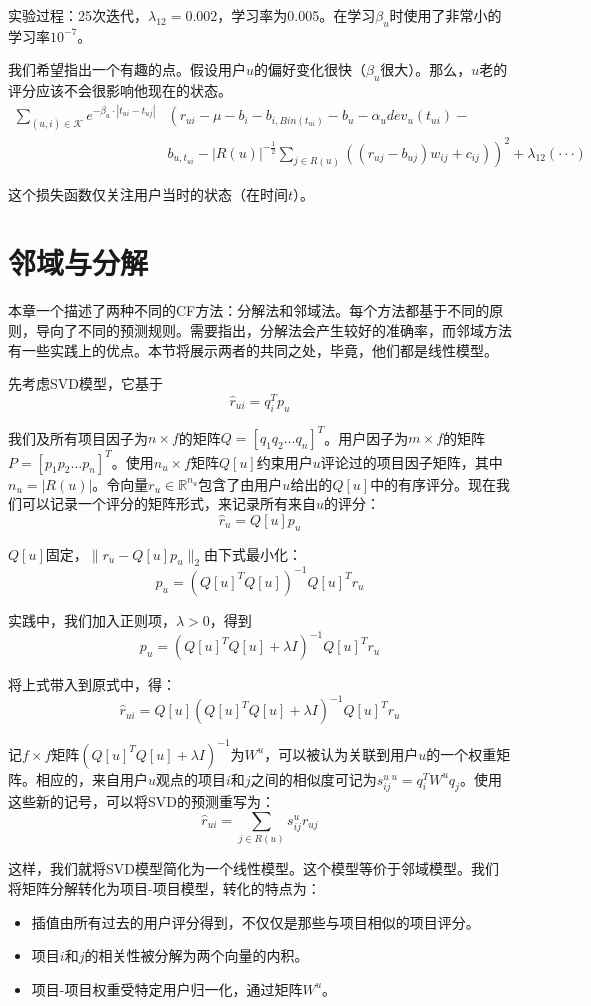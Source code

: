 \documentclass{article}
\begin{document}
实验过程：25次迭代，$\lambda_{12}=0.002$，学习率为0.005。在学习$\beta_u$时使用了非常小的学习率$10^{-7}$。

我们希望指出一个有趣的点。假设用户$u$的偏好变化很快（$\beta_u$很大）。那么，$u$老的评分应该不会很影响他现在的状态。
\[
\begin{array}{cl}
\mathop{\sum}\limits_{(u,i)\in\mathcal{K}}e^{-\beta_u\cdot|t_{ui}-t_{uj}|} & \left(r_{ui}-\mu-b_i-b_{i,Bin(t_{ui})}-b_u-\alpha_u dev_u(t_{ui})-\right.\\
  & \left.b_{u,t_{ui}}-|R(u)|^{-\frac{1}{2}}\mathop{\sum}\limits_{j\in R(u)}((r_{uj}-b_{uj})w_{ij}+c_{ij})\right)^2+\lambda_{12}(\cdot\cdot\cdot)
\end{array}
\]

这个损失函数仅关注用户当时的状态（在时间$t$）。

\section{邻域与分解}
本章一个描述了两种不同的CF方法：分解法和邻域法。每个方法都基于不同的原则，导向了不同的预测规则。需要指出，分解法会产生较好的准确率，而邻域方法有一些实践上的优点。本节将展示两者的共同之处，毕竟，他们都是线性模型。

先考虑SVD模型，它基于
$$ \hat{r}_{ui}=q_i^Tp_u $$

我们及所有项目因子为$n\times f$的矩阵$Q=[q_1q_2\dots q_n]^T$。用户因子为$m\times f$的矩阵$P=[p_1p_2\dots p_n]^T$。使用$n_u\times f$矩阵$Q[u]$约束用户$u$评论过的项目因子矩阵，其中$n_u=|R(u)|$。令向量$r_u\in\mathbb{R}^{n_u}$包含了由用户$u$给出的$Q[u]$中的有序评分。现在我们可以记录一个评分的矩阵形式，来记录所有来自$u$的评分：
$$ \hat{r}_{u}=Q[u]p_u $$

$Q[u]$固定，$\|r_u-Q[u]p_u\|_2$由下式最小化：
$$ p_u=(Q[u]^TQ[u])^{-1}Q[u]^Tr_u $$

实践中，我们加入正则项，$\lambda>0$，得到
$$ p_u=(Q[u]^TQ[u]+\lambda I)^{-1}Q[u]^Tr_u $$

将上式带入到原式中，得：
$$ \hat{r}_{ui}=Q[u](Q[u]^TQ[u]+\lambda I)^{-1}Q[u]^Tr_u $$

记$f\times f$矩阵$(Q[u]^TQ[u]+\lambda I)^{-1}$为$W^u$，可以被认为关联到用户$u$的一个权重矩阵。相应的，来自用户$u$观点的项目$i$和$j$之间的相似度可记为$s^u_{ij}^u=q_i^TW^uq_j$。使用这些新的记号，可以将SVD的预测重写为：
$$ \hat{r}_{ui}=\mathop{\sum}\limits_{j\in R(u)}s_{ij}^ur_{uj} $$

这样，我们就将SVD模型简化为一个线性模型。这个模型等价于邻域模型。我们将矩阵分解转化为项目-项目模型，转化的特点为：
\begin{itemize}
\item 插值由所有过去的用户评分得到，不仅仅是那些与项目相似的项目评分。
\item 项目$i$和$j$的相关性被分解为两个向量的内积。
\item 项目-项目权重受特定用户归一化，通过矩阵$W^u$。
\end{itemize}
\end{document}
